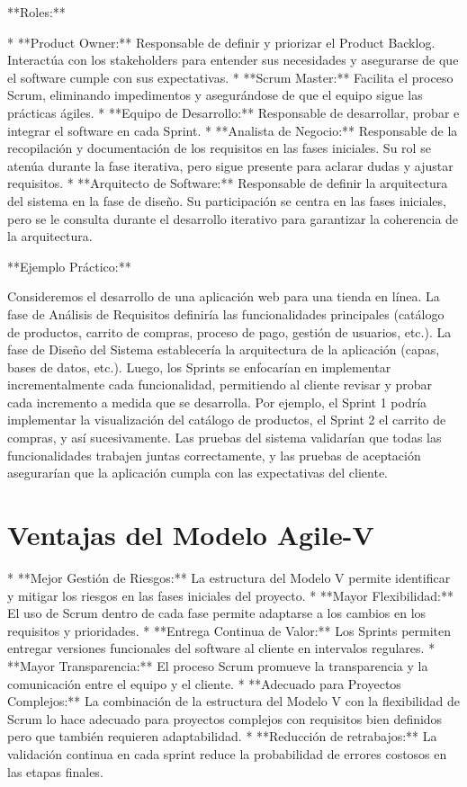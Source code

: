 \documentclass[12pt, spanish]{article}
\begin{document}
**Roles:**

*   **Product Owner:** Responsable de definir y priorizar el Product Backlog. Interactúa con los stakeholders para entender sus necesidades y asegurarse de que el software cumple con sus expectativas.
*   **Scrum Master:** Facilita el proceso Scrum, eliminando impedimentos y asegurándose de que el equipo sigue las prácticas ágiles.
*   **Equipo de Desarrollo:** Responsable de desarrollar, probar e integrar el software en cada Sprint.
*   **Analista de Negocio:**  Responsable de la recopilación y documentación de los requisitos en las fases iniciales. Su rol se atenúa durante la fase iterativa, pero sigue presente para aclarar dudas y ajustar requisitos.
*   **Arquitecto de Software:** Responsable de definir la arquitectura del sistema en la fase de diseño.  Su participación se centra en las fases iniciales, pero se le consulta durante el desarrollo iterativo para garantizar la coherencia de la arquitectura.

**Ejemplo Práctico:**

Consideremos el desarrollo de una aplicación web para una tienda en línea. La fase de Análisis de Requisitos definiría las funcionalidades principales (catálogo de productos, carrito de compras, proceso de pago, gestión de usuarios, etc.). La fase de Diseño del Sistema establecería la arquitectura de la aplicación (capas, bases de datos, etc.). Luego, los Sprints se enfocarían en implementar incrementalmente cada funcionalidad, permitiendo al cliente revisar y probar cada incremento a medida que se desarrolla.  Por ejemplo, el Sprint 1 podría implementar la visualización del catálogo de productos, el Sprint 2 el carrito de compras, y así sucesivamente.  Las pruebas del sistema validarían que todas las funcionalidades trabajen juntas correctamente, y las pruebas de aceptación asegurarían que la aplicación cumpla con las expectativas del cliente.

\section*{Ventajas del Modelo Agile-V}

*   **Mejor Gestión de Riesgos:** La estructura del Modelo V permite identificar y mitigar los riesgos en las fases iniciales del proyecto.
*   **Mayor Flexibilidad:** El uso de Scrum dentro de cada fase permite adaptarse a los cambios en los requisitos y prioridades.
*   **Entrega Continua de Valor:** Los Sprints permiten entregar versiones funcionales del software al cliente en intervalos regulares.
*   **Mayor Transparencia:** El proceso Scrum promueve la transparencia y la comunicación entre el equipo y el cliente.
*   **Adecuado para Proyectos Complejos:** La combinación de la estructura del Modelo V con la flexibilidad de Scrum lo hace adecuado para proyectos complejos con requisitos bien definidos pero que también requieren adaptabilidad.
*   **Reducción de retrabajos:** La validación continua en cada sprint reduce la probabilidad de errores costosos en las etapas finales.
\end{document}
